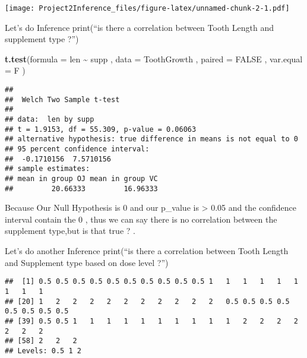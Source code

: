 \documentclass[
]{article}
\newenvironment{Shaded}{\begin{snugshade}}{\end{snugshade}}
\newcommand{\DataTypeTok}[1]{\textcolor[rgb]{0.13,0.29,0.53}{#1}}
\newcommand{\KeywordTok}[1]{\textcolor[rgb]{0.13,0.29,0.53}{\textbf{#1}}}
\newcommand{\NormalTok}[1]{#1}
\newcommand{\OperatorTok}[1]{\textcolor[rgb]{0.81,0.36,0.00}{\textbf{#1}}}
\newcommand{\OtherTok}[1]{\textcolor[rgb]{0.56,0.35,0.01}{#1}}
\newcommand{\StringTok}[1]{\textcolor[rgb]{0.31,0.60,0.02}{#1}}
\begin{document}
\texttt{[image: Project2Inference\_files/figure-latex/unnamed-chunk-2-1.pdf]}

Let's do Inference print(``is there a correlation between Tooth Length
and supplement type ?'')

\begin{Shaded}
\begin{Highlighting}[]
\KeywordTok{t.test}\NormalTok{(}\DataTypeTok{formula =}\NormalTok{ len }\OperatorTok{\textasciitilde{}}\StringTok{ }\NormalTok{supp , }\DataTypeTok{data =}\NormalTok{ ToothGrowth , }\DataTypeTok{paired =} \OtherTok{FALSE}\NormalTok{ , }\DataTypeTok{var.equal =}\NormalTok{ F )}
\end{Highlighting}
\end{Shaded}

\begin{verbatim}
## 
##  Welch Two Sample t-test
## 
## data:  len by supp
## t = 1.9153, df = 55.309, p-value = 0.06063
## alternative hypothesis: true difference in means is not equal to 0
## 95 percent confidence interval:
##  -0.1710156  7.5710156
## sample estimates:
## mean in group OJ mean in group VC 
##         20.66333         16.96333
\end{verbatim}

Because Our Null Hypothesis is 0 and our p\_value is \textgreater{} 0.05
and the confidence interval contain the 0 , thus we can say there is no
correlation between the supplement type,but is that true ? .

Let's do another Inference print(``is there a correlation between Tooth
Length and Supplement type based on dose level ?'')

\begin{Shaded}
\end{Shaded}

\begin{verbatim}
##  [1] 0.5 0.5 0.5 0.5 0.5 0.5 0.5 0.5 0.5 0.5 1   1   1   1   1   1   1   1   1  
## [20] 1   2   2   2   2   2   2   2   2   2   2   0.5 0.5 0.5 0.5 0.5 0.5 0.5 0.5
## [39] 0.5 0.5 1   1   1   1   1   1   1   1   1   1   2   2   2   2   2   2   2  
## [58] 2   2   2  
## Levels: 0.5 1 2
\end{verbatim}
\end{document}
